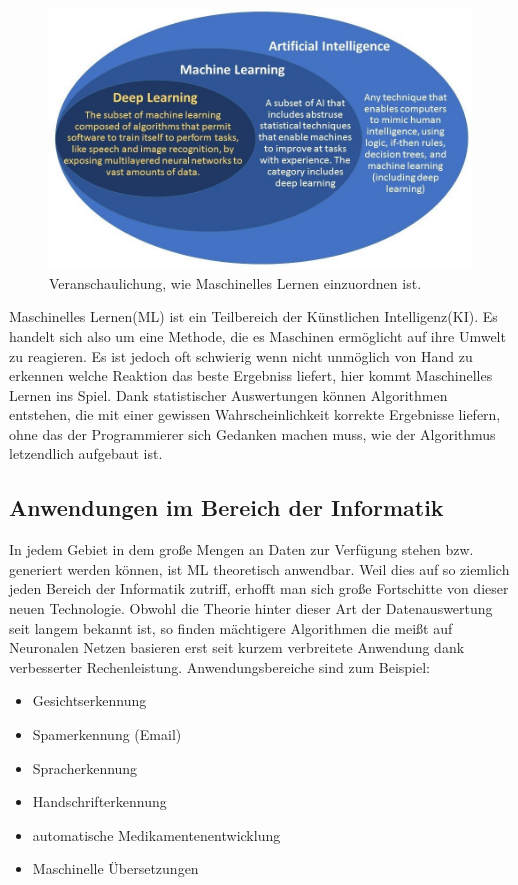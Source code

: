\documentclass{thesisclass}
\begin{document}
\begin{figure}[h!]
  \center
  \includegraphics[width=\textwidth]{images/machineLearningInAI.jpg}
  \caption{Veranschaulichung, wie Maschinelles Lernen einzuordnen ist. \cite{machineLearning1}}
  \label{fig:Veranschaulichung, wie Maschinelles Lernen einzuordnen ist.}
\end{figure}

Maschinelles Lernen(\gls{ML}) ist ein Teilbereich der K\"unstlichen Intelligenz(\gls{KI}). Es handelt sich also um eine Methode, die es Maschinen erm\"oglicht auf ihre Umwelt zu reagieren. Es ist jedoch oft schwierig wenn nicht unm\"oglich von Hand zu erkennen welche Reaktion das beste Ergebniss liefert, hier kommt Maschinelles Lernen ins Spiel. Dank statistischer Auswertungen k\"onnen Algorithmen entstehen, die mit einer gewissen Wahrscheinlichkeit korrekte Ergebnisse liefern, ohne das der Programmierer sich Gedanken machen muss, wie der Algorithmus letzendlich aufgebaut ist. \newline

\subsection{Anwendungen im Bereich der Informatik}
	In jedem Gebiet in dem große Mengen an Daten zur Verf\"ugung stehen bzw. generiert werden können, ist \gls{ML} theoretisch anwendbar. Weil dies auf so ziemlich jeden Bereich der Informatik zutriff, erhofft man sich große Fortschitte von dieser neuen Technologie. \newline
Obwohl die Theorie hinter dieser Art der Datenauswertung seit langem bekannt ist, so finden m\"achtigere Algorithmen die meißt auf Neuronalen Netzen basieren erst seit kurzem verbreitete Anwendung dank verbesserter Rechenleistung. \cite{DBLP:journals/corr/abs-1803-08971} \newline
	\newline Anwendungsbereiche sind zum Beispiel:
\begin{itemize}
	\item Gesichtserkennung
	\item Spamerkennung (Email)
	\item Spracherkennung
	\item Handschrifterkennung
	\item automatische Medikamentenentwicklung
	\item Maschinelle Übersetzungen
\end{itemize}
\end{document}
